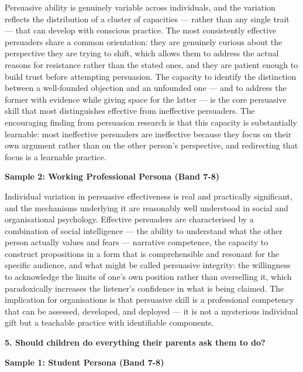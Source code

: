 Persuasive ability is genuinely variable across individuals, and the variation reflects the distribution of a cluster of capacities — rather than any single trait — that can develop with conscious practice. The most consistently effective persuaders share a common orientation: they are genuinely curious about the perspective they are trying to shift, which allows them to address the actual reasons for resistance rather than the stated ones, and they are patient enough to build trust before attempting persuasion. The capacity to identify the distinction between a well-founded objection and an unfounded one — and to address the former with evidence while giving space for the latter — is the core persuasive skill that most distinguishes effective from ineffective persuaders. The encouraging finding from persuasion research is that this capacity is substantially learnable: most ineffective persuaders are ineffective because they focus on their own argument rather than on the other person's perspective, and redirecting that focus is a learnable practice.

\textbf{Sample 2: Working Professional Persona (Band 7-8)}

Individual variation in persuasive effectiveness is real and practically significant, and the mechanisms underlying it are reasonably well understood in social and organisational psychology. Effective persuaders are characterised by a combination of social intelligence — the ability to understand what the other person actually values and fears — narrative competence, the capacity to construct propositions in a form that is comprehensible and resonant for the specific audience, and what might be called persuasive integrity: the willingness to acknowledge the limits of one's own position rather than overselling it, which paradoxically increases the listener's confidence in what is being claimed. The implication for organisations is that persuasive skill is a professional competency that can be assessed, developed, and deployed — it is not a mysterious individual gift but a teachable practice with identifiable components.

\separator

\begin{ieltsquestion}
\textbf{5. Should children do everything their parents ask them to do?}
\end{ieltsquestion}
\textbf{Sample 1: Student Persona (Band 7-8)}

